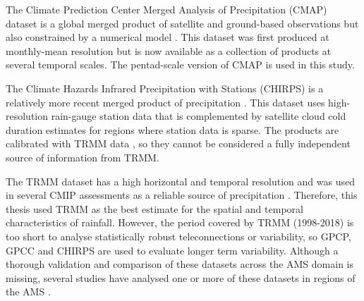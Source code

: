 The Climate Prediction Center Merged Analysis of Precipitation (CMAP) dataset is a global merged product of satellite and ground-based observations but also constrained by a numerical model \citep{Xie2007}. This dataset was first produced at monthly-mean resolution \citep{xie1997} but is now available as a collection of products at several temporal scales. The pentad-scale version of CMAP is used in this study. %

The Climate Hazards Infrared Precipitation with Stations (CHIRPS) is a relatively more recent merged product of precipitation \citep{funk2015}. This dataset uses high-resolution rain-gauge station data that is complemented by satellite cloud cold duration estimates for regions where station data is sparse. The products are calibrated with TRMM data \citep{funk2015}, so they cannot be considered a fully independent source of information from TRMM.


The TRMM dataset has a high horizontal and temporal resolution and was used in several CMIP assessments \citep{geil2013,jones2013} as a reliable source of precipitation \citep{carvalho2012}. Therefore, this thesis used TRMM as the best estimate for the spatial and temporal characteristics of rainfall. However,
 the period covered by TRMM (1998-2018) is too short to analyse statistically robust teleconnections or variability, so GPCP, GPCC and CHIRPS are used to evaluate longer term variability.
 Although a thorough validation and comparison of these datasets across the AMS domain is missing, several studies have analysed  one or more of these datasets in regions of the AMS \citep[e.g.][]{franchito2009,dinku2010,trejo2016}.


